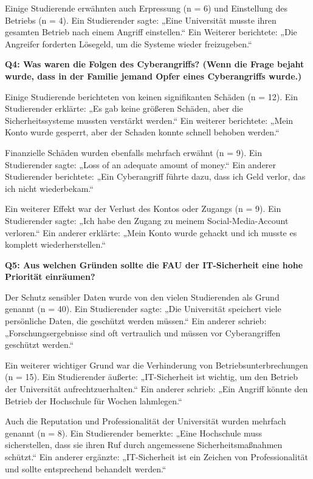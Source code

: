 \documentclass[german,report]{i1thesis}
\begin{document}
Einige Studierende erwähnten auch Erpressung (n = 6) und Einstellung des Betriebs (n = 4). Ein Studierender sagte: „Eine Universität musste ihren gesamten Betrieb nach einem Angriff einstellen.“ Ein Weiterer berichtete: „Die Angreifer forderten Lösegeld, um die Systeme wieder freizugeben.“

\textbf{Q4: Was waren die Folgen des Cyberangriffs? (Wenn die Frage bejaht wurde, dass in der Familie jemand Opfer eines Cyberangriffs wurde.)}

Einige Studierende berichteten von keinen signifikanten Schäden (n = 12). Ein Studierender erklärte: „Es gab keine größeren Schäden, aber die Sicherheitssysteme mussten verstärkt werden.“ Ein weiterer berichtete: „Mein Konto wurde gesperrt, aber der Schaden konnte schnell behoben werden.“

Finanzielle Schäden wurden ebenfalls mehrfach erwähnt (n = 9). Ein Studierender sagte: „Loss of an adequate amount of money.“ Ein anderer Studierender berichtete: „Ein Cyberangriff führte dazu, dass ich Geld verlor, das ich nicht wiederbekam.“

Ein weiterer Effekt war der Verlust des Kontos oder Zugangs (n = 9). Ein Studierender sagte: „Ich habe den Zugang zu meinem Social-Media-Account verloren.“ Ein anderer erklärte: „Mein Konto wurde gehackt und ich musste es komplett wiederherstellen.“

\textbf{Q5: Aus welchen Gründen sollte die FAU der IT-Sicherheit eine hohe Priorität einräumen?}

Der Schutz sensibler Daten wurde von den vielen Studierenden als Grund genannt (n = 40). Ein Studierender sagte: „Die Universität speichert viele persönliche Daten, die geschützt werden müssen.“ Ein anderer schrieb: „Forschungsergebnisse sind oft vertraulich und müssen vor Cyberangriffen geschützt werden.“

Ein weiterer wichtiger Grund war die Verhinderung von Betriebsunterbrechungen (n = 15). Ein Studierender äußerte: „IT-Sicherheit ist wichtig, um den Betrieb der Universität aufrechtzuerhalten.“ Ein anderer schrieb: „Ein Angriff könnte den Betrieb der Hochschule für Wochen lahmlegen.“

Auch die Reputation und Professionalität der Universität wurden mehrfach genannt (n = 8). Ein Studierender bemerkte: „Eine Hochschule muss sicherstellen, dass sie ihren Ruf durch angemessene Sicherheitsmaßnahmen schützt.“ Ein anderer ergänzte: „IT-Sicherheit ist ein Zeichen von Professionalität und sollte entsprechend behandelt werden.“
\end{document}
